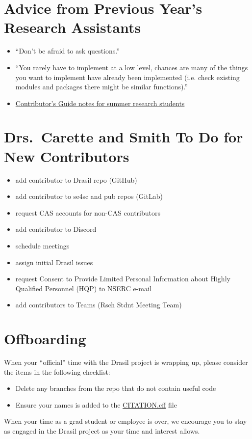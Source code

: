 \documentclass[12pt]{article}
\begin{document}
\section{Advice from Previous Year's Research Assistants} \label{SecAdvice}

\begin{itemize}

\item ``Don't be afraid to ask questions.''

\item ``You rarely have to implement at a low level, chances are many of the
things you want to implement have already been implemented (i.e. check existing
modules and packages there might be similar functions).''

\item
\href{https://github.com/JacquesCarette/Drasil/wiki/Contributor's-Guide#note-to-future-summer-research-students}
{Contributor's Guide notes for summer research students}

\end{itemize}

\section{Drs.\ Carette and Smith To Do for New Contributors} \label{SecToDo}

\begin{itemize}
\item add contributor to Drasil repo (GitHub)
\item add contributor to se4sc and pub repos (GitLab)
\item request CAS accounts for non-CAS contributors
\item add contributor to Discord 
\item schedule meetings
\item assign initial Drasil issues
\item request Consent to Provide Limited Personal Information about Highly
Qualified Personnel (HQP) to NSERC e-mail
\item add contributors to Teams (Rsch Stdnt Meeting Team)
\end{itemize}

\section{Offboarding}

When your ``official'' time with the Drasil project is wrapping up, please consider
the items in the following checklist:

\begin{itemize}
\item Delete any branches from the repo that do not contain useful code
\item Ensure your names is added to the
\href{https://github.com/JacquesCarette/Drasil/blob/main/CITATION.cff}
{CITATION.cff} file
\end{itemize}

When your time as a grad student or employee is over, we encourage you to stay
as engaged in the Drasil project as your time and interest allows.
\end{document}
